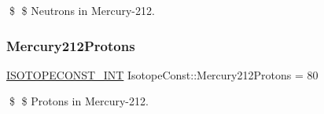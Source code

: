 \$ \$ Neutrons in Mercury-\/212. \mbox{\label{group___isotope_const-_mercury-_hg212_ga09f54237bd8ab9018f9acff6e8557264}} 
\subsubsection{\texorpdfstring{Mercury212\+Protons}{Mercury212Protons}}
{\footnotesize\ttfamily \mbox{\hyperlink{group___isotope_const-_macros_ga5f18360b3e99483a35c32d789e62621c}{I\+S\+O\+T\+O\+P\+E\+C\+O\+N\+S\+T\+\_\+\+I\+NT}} Isotope\+Const\+::\+Mercury212\+Protons = 80}

\$ \$ Protons in Mercury-\/212. 